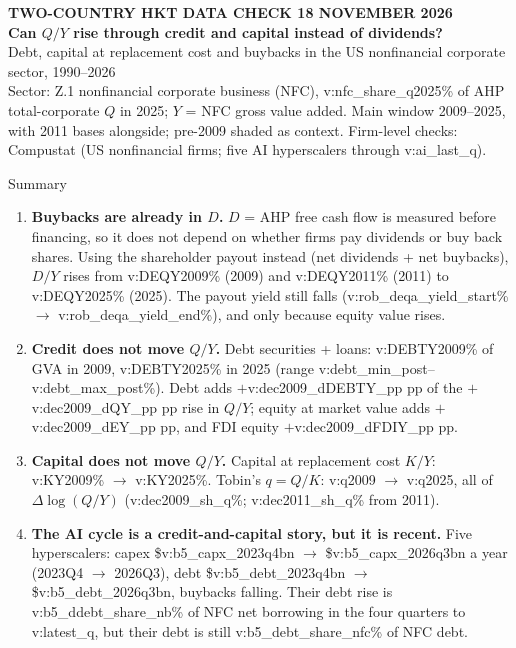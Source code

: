 \documentclass[aspectratio=169,10pt,t]{beamer}
\newcommand{\val}[1]{\csname v:#1\endcsname}
\begin{document}
\begin{frame}[plain]
\vspace{1.3cm}
{\scriptsize\textcolor{muted}{\textbf{TWO-COUNTRY HKT \textperiodcentered{} DATA CHECK \textperiodcentered{} 18 NOVEMBER 2026}}}\\[0.3cm]
{\Large\textbf{Can $Q/Y$ rise through credit and capital instead of dividends?}}\\[0.3cm]
{\normalsize\textcolor{inksec}{Debt, capital at replacement cost and buybacks in the US nonfinancial corporate sector, 1990--2026}}\\[0.7cm]
{\small Sector: Z.1 nonfinancial corporate business (NFC), \val{nfc_share_q2025}\% of AHP total-corporate $Q$ in 2025; $Y$ = NFC gross value added. Main window 2009--2025, with 2011 bases alongside; pre-2009 shaded as context. Firm-level checks: Compustat (US nonfinancial firms; five AI hyperscalers through \val{ai_last_q}).}
\end{frame}

\begin{frame}{Summary}
\vspace{0.1cm}
\begin{enumerate}\setlength{\itemsep}{0.22cm}
\item \textbf{Buybacks are already in $D$.} $D$ = AHP free cash flow is measured before financing, so it does not depend on whether firms pay dividends or buy back shares. Using the shareholder payout instead (net dividends + net buybacks), $D/Y$ rises from \val{DEQY2009}\% (2009) and \val{DEQY2011}\% (2011) to \val{DEQY2025}\% (2025). The payout yield still falls (\val{rob_deqa_yield_start}\% $\to$ \val{rob_deqa_yield_end}\%), and only because equity value rises.
\item \textbf{Credit does not move $Q/Y$.} Debt securities + loans: \val{DEBTY2009}\% of GVA in 2009, \val{DEBTY2025}\% in 2025 (range \val{debt_min_post}--\val{debt_max_post}\%). Debt adds $+$\val{dec2009_dDEBTY_pp} pp of the $+$\val{dec2009_dQY_pp} pp rise in $Q/Y$; equity at market value adds $+$\val{dec2009_dEY_pp} pp, and FDI equity $+$\val{dec2009_dFDIY_pp} pp.
\item \textbf{Capital does not move $Q/Y$.} Capital at replacement cost $K/Y$: \val{KY2009}\% $\to$ \val{KY2025}\%. Tobin's $q=Q/K$: \val{q2009} $\to$ \val{q2025}, all of $\Delta\log(Q/Y)$ (\val{dec2009_sh_q}\%; \val{dec2011_sh_q}\% from 2011).
\item \textbf{The AI cycle is a credit-and-capital story, but it is recent.} Five hyperscalers: capex \$\val{b5_capx_2023q4}bn $\to$ \$\val{b5_capx_2026q3}bn a year (2023Q4 $\to$ 2026Q3), debt \$\val{b5_debt_2023q4}bn $\to$ \$\val{b5_debt_2026q3}bn, buybacks falling. Their debt rise is \val{b5_ddebt_share_nb}\% of NFC net borrowing in the four quarters to \val{latest_q}, but their debt is still \val{b5_debt_share_nfc}\% of NFC debt.
\end{enumerate}
\end{frame}
\end{document}
